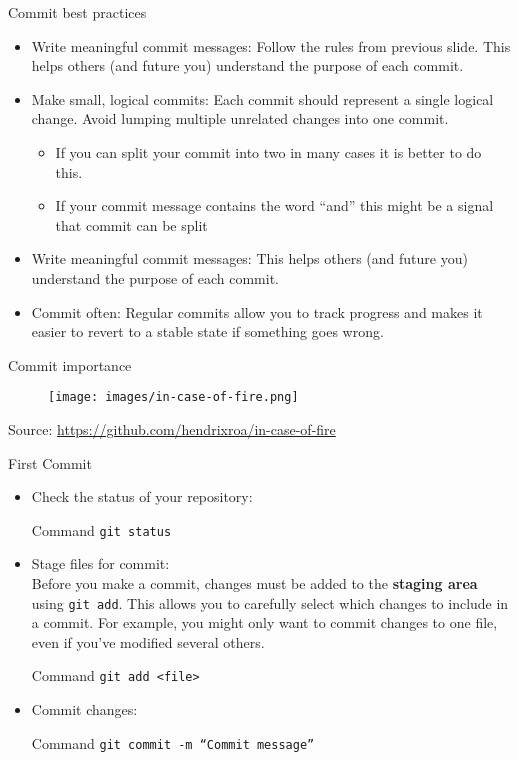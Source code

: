 \documentclass{beamer}
\begin{document}
\begin{frame}{Commit best practices}
  \begin{itemize}
    \item Write meaningful commit messages: Follow the rules from previous slide. This helps others (and future you) understand the purpose of each commit.
    \item Make small, logical commits: Each commit should represent a single logical change. Avoid lumping multiple unrelated changes into one commit.
      \begin{itemize}
        \item If you can split your commit into two in many cases it is better to do this.
        \item If your commit message contains the word ``and'' this might be a signal that commit can be split
      \end{itemize}
    \item Write meaningful commit messages: This helps others (and future you) understand the purpose of each commit.
    \item Commit often: Regular commits allow you to track progress and makes it easier to revert to a stable state if something goes wrong.
  \end{itemize}
\end{frame}

\begin{frame}{Commit importance}
  \begin{figure}[h]
    \centering
    \texttt{[image: images/in-case-of-fire.png]}
  \end{figure}
  {\footnotesize Source: \href{https://github.com/hendrixroa/in-case-of-fire}{https://github.com/hendrixroa/in-case-of-fire}}
\end{frame}

\begin{frame}{First Commit}
  \begin{itemize}
      \item Check the status of your repository:
      \begin{block}{Command}
        \texttt{git status}
      \end{block}
      \item Stage files for commit:\\
        Before you make a commit, changes must be added to the \textbf{staging area} using \texttt{git add}. This allows you to carefully select which changes to include in a commit. For example, you might only want to commit changes to one file, even if you've modified several others.
      \begin{block}{Command}
        \texttt{git add <file>}
      \end{block}
      \item Commit changes:
      \begin{block}{Command}
          \texttt{git commit -m ``Commit message''}
      \end{block}
  \end{itemize}
\end{frame}
\end{document}
